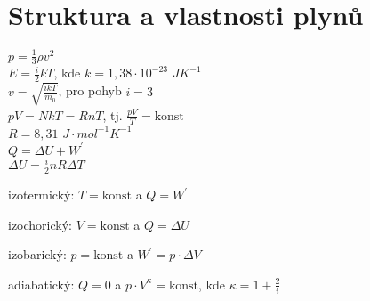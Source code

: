 \documentclass{article}
\begin{document}
\section{Struktura a vlastnosti plynů}
\begin{multicols}{2}
\noindent$p=\frac{1}{3}\rho v^2$\\
$E=\frac{i}{2}kT$, kde $k=1,38\cdot 10^{-23}$ $JK^{-1}$\\
$v=\sqrt{\frac{ikT}{m_0}}$, pro pohyb $i=3$\\
$pV=NkT=RnT$, tj. $\frac{pV}{T}=\textrm{konst}$\\
$R = 8,31$ $J\cdot mol ^{-1}K^{-1}$\\
$Q=\Delta U+W^\prime$\\
$\Delta U=\frac{i}{2}nR\Delta T$
\end{multicols}
\begin{multicols}{}
    \begin{description}
        \vspace{-0.5em}
        \setlength\itemsep{0.15em}
        \item[$i.$] izotermický: $T=\textrm{konst}$ a $Q=W^\prime$
        \item[$ii.$] izochorický: $V=\textrm{konst}$ a $Q=\Delta U$
        \item[$iii.$] izobarický: $p=\textrm{konst}$ a $W^\prime = p\cdot \Delta V$
        \item[$iv.$] adiabatický: $Q=0$ a $p\cdot V^\kappa = \textrm{konst}$, kde $\kappa = 1+\frac{2}{i}$
    \end{description}
\end{multicols}
\end{document}
